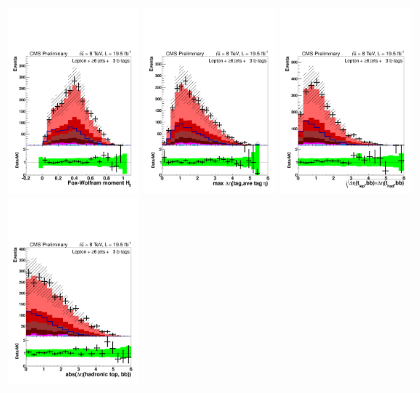 \clearpage



\begin{figure}[hbtp]
 \begin{center}
   \includegraphics[width=0.31\textwidth]{Figures/Analysis_2_Diagrams/LJ_plots_lep/6j3t/lep_h3_6j3t_cumulative_wRatio_noLegend_lin.pdf}
   \includegraphics[width=0.31\textwidth]{Figures/Analysis_2_Diagrams/LJ_plots_lep/6j3t/lep_maxeta_tag_tag_6j3t_cumulative_wRatio_noLegend_lin.pdf}
   \includegraphics[width=0.31\textwidth]{Figures/Analysis_2_Diagrams/LJ_plots_lep/6j3t/lep_dEta_fn_6j3t_cumulative_wRatio_noLegend_lin.pdf}
   \includegraphics[width=0.31\textwidth]{Figures/Analysis_2_Diagrams/LJ_plots_lep/6j3t/lep_abs_dEta_hadtop_bb_6j3t_cumulative_wRatio_noLegend_lin.pdf}

\end{center}
\end{figure}
